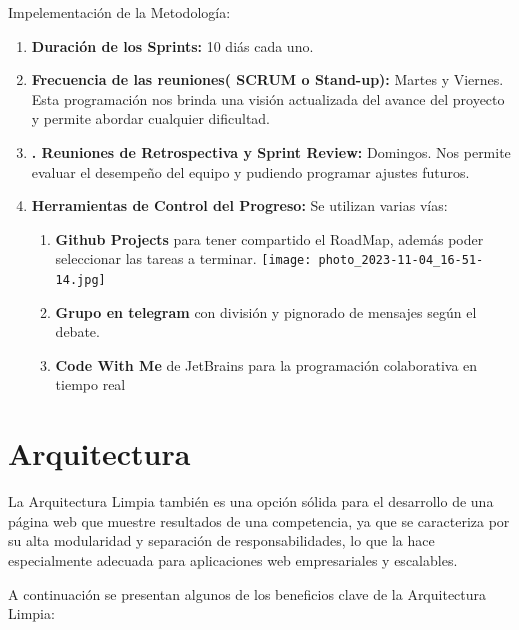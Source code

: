 \documentclass{article} %
\begin{document}
Impelementación de la Metodología:
\begin{enumerate}
    \item \textbf{Duración de los Sprints:} 10 diás cada uno.
    \item \textbf{Frecuencia de las reuniones( SCRUM o Stand-up):} Martes y Viernes. Esta programación nos brinda una visión actualizada del avance del proyecto y permite abordar cualquier dificultad.
    \item \textbf{. Reuniones de Retrospectiva y Sprint Review:} Domingos. Nos permite evaluar el desempeño del equipo y pudiendo programar ajustes futuros.
    \item \textbf{Herramientas de Control del Progreso:} Se utilizan varias vías:
    \begin{enumerate}
        \item \textbf{Github Projects} para tener compartido el  RoadMap, además poder seleccionar las tareas a terminar. 
        \newline
        \texttt{[image: photo\_2023-11-04\_16-51-14.jpg]}
        
        \item \textbf{Grupo en telegram} con división y pignorado de mensajes según el debate. 
        \item \textbf{Code With Me} de JetBrains para la programación colaborativa en tiempo real
    \end{enumerate}
\end{enumerate}
\section{Arquitectura}
La Arquitectura Limpia también es una opción sólida para el desarrollo de una página web que muestre resultados de una competencia, ya que se caracteriza por su alta modularidad y separación de responsabilidades, lo que la hace especialmente adecuada para aplicaciones web empresariales y escalables.

A continuación se presentan algunos de los beneficios clave de la Arquitectura Limpia:
\end{document}
